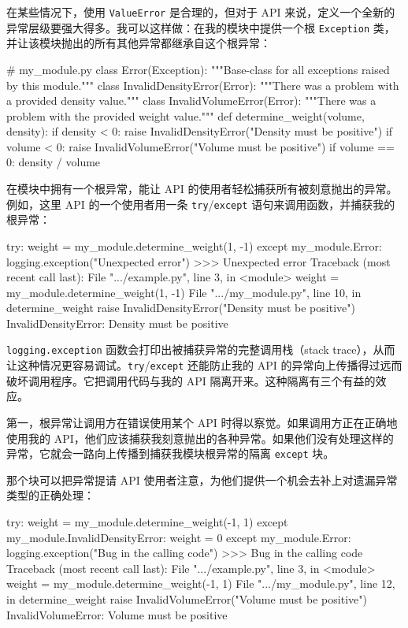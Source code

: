 在某些情况下，使用 \texttt{ValueError} 是合理的，但对于 API 来说，定义一个全新的异常层级要强大得多。我可以这样做：在我的模块中提供一个根 \texttt{Exception} 类，并让该模块抛出的所有其他异常都继承自这个根异常：

\begin{codebox}[python]
# my_module.py
class Error(Exception):
    """Base-class for all exceptions raised by this module."""
class InvalidDensityError(Error):
    """There was a problem with a provided density value."""
class InvalidVolumeError(Error):
    """There was a problem with the provided weight value."""
def determine_weight(volume, density):
    if density < 0:
        raise InvalidDensityError("Density must be positive")
    if volume < 0:
        raise InvalidVolumeError("Volume must be positive")
    if volume == 0:
        density / volume
\end{codebox}

在模块中拥有一个根异常，能让 API 的使用者轻松捕获所有被刻意抛出的异常。例如，这里 API 的一个使用者用一条 \texttt{try}/\texttt{except} 语句来调用函数，并捕获我的根异常：

\begin{codebox}[python]
try:
    weight = my_module.determine_weight(1, -1)
except my_module.Error:
    logging.exception("Unexpected error")
>>>
Unexpected error
Traceback (most recent call last):
  File ".../example.py", line 3, in <module>
    weight = my_module.determine_weight(1, -1)
  File ".../my_module.py", line 10, in determine_weight
    raise InvalidDensityError("Density must be positive")
InvalidDensityError: Density must be positive
\end{codebox}

\texttt{logging.exception} 函数会打印出被捕获异常的完整调用栈（stack trace），从而让这种情况更容易调试。\texttt{try}/\texttt{except} 还能防止我的 API 的异常向上传播得过远而破坏调用程序。它把调用代码与我的 API 隔离开来。这种隔离有三个有益的效应。

第一，根异常让调用方在错误使用某个 API 时得以察觉。如果调用方正在正确地使用我的 API，他们应该捕获我刻意抛出的各种异常。如果他们没有处理这样的异常，它就会一路向上传播到捕获我模块根异常的隔离 \texttt{except} 块。

那个块可以把异常提请 API 使用者注意，为他们提供一个机会去补上对遗漏异常类型的正确处理：

\begin{codebox}[python]
try:
    weight = my_module.determine_weight(-1, 1)
except my_module.InvalidDensityError:
    weight = 0
except my_module.Error:
    logging.exception("Bug in the calling code")
>>>
Bug in the calling code
Traceback (most recent call last):
  File ".../example.py", line 3, in <module>
    weight = my_module.determine_weight(-1, 1)
  File ".../my_module.py", line 12, in determine_weight
    raise InvalidVolumeError("Volume must be positive")
InvalidVolumeError: Volume must be positive
\end{codebox}

